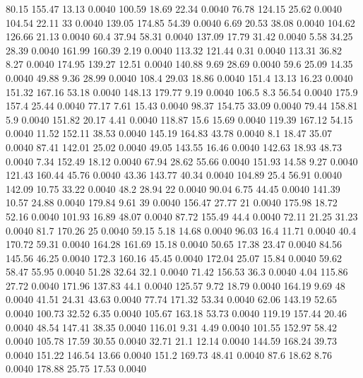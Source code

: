 80.15	155.47	13.13	0.0040
100.59	18.69	22.34	0.0040
76.78	124.15	25.62	0.0040
104.54	22.11	33	0.0040
139.05	174.85	54.39	0.0040
6.69	20.53	38.08	0.0040
104.62	126.66	21.13	0.0040
60.4	37.94	58.31	0.0040
137.09	17.79	31.42	0.0040
5.58	34.25	28.39	0.0040
161.99	160.39	2.19	0.0040
113.32	121.44	0.31	0.0040
113.31	36.82	8.27	0.0040
174.95	139.27	12.51	0.0040
140.88	9.69	28.69	0.0040
59.6	25.09	14.35	0.0040
49.88	9.36	28.99	0.0040
108.4	29.03	18.86	0.0040
151.4	13.13	16.23	0.0040
151.32	167.16	53.18	0.0040
148.13	179.77	9.19	0.0040
106.5	8.3	56.54	0.0040
175.9	157.4	25.44	0.0040
77.17	7.61	15.43	0.0040
98.37	154.75	33.09	0.0040
79.44	158.81	5.9	0.0040
151.82	20.17	4.41	0.0040
118.87	15.6	15.69	0.0040
119.39	167.12	54.15	0.0040
11.52	152.11	38.53	0.0040
145.19	164.83	43.78	0.0040
8.1	18.47	35.07	0.0040
87.41	142.01	25.02	0.0040
49.05	143.55	16.46	0.0040
142.63	18.93	48.73	0.0040
7.34	152.49	18.12	0.0040
67.94	28.62	55.66	0.0040
151.93	14.58	9.27	0.0040
121.43	160.44	45.76	0.0040
43.36	143.77	40.34	0.0040
104.89	25.4	56.91	0.0040
142.09	10.75	33.22	0.0040
48.2	28.94	22	0.0040
90.04	6.75	44.45	0.0040
141.39	10.57	24.88	0.0040
179.84	9.61	39	0.0040
156.47	27.77	21	0.0040
175.98	18.72	52.16	0.0040
101.93	16.89	48.07	0.0040
87.72	155.49	44.4	0.0040
72.11	21.25	31.23	0.0040
81.7	170.26	25	    0.0040
59.15	5.18	14.68	0.0040
96.03	16.4	11.71	0.0040
40.4	170.72	59.31	0.0040
164.28	161.69	15.18	0.0040
50.65	17.38	23.47	0.0040
84.56	145.56	46.25	0.0040
172.3	160.16	45.45	0.0040
172.04	25.07	15.84	0.0040
59.62	58.47	55.95	0.0040
51.28	32.64	32.1	0.0040
71.42	156.53	36.3	0.0040
4.04	115.86	27.72	0.0040
171.96	137.83	44.1	0.0040
125.57	9.72	18.79	0.0040
164.19	9.69	48	    0.0040
41.51	24.31	43.63	0.0040
77.74	171.32	53.34	0.0040
62.06	143.19	52.65	0.0040
100.73	32.52	6.35	0.0040
105.67	163.18	53.73	0.0040
119.19	157.44	20.46	0.0040
48.54	147.41	38.35	0.0040
116.01	9.31	4.49	0.0040
101.55	152.97	58.42	0.0040
105.78	17.59	30.55	0.0040
32.71	21.1	12.14	0.0040
144.59	168.24	39.73	0.0040
151.22	146.54	13.66	0.0040
151.2	169.73	48.41	0.0040
87.6	18.62	8.76	0.0040
178.88	25.75	17.53	0.0040
